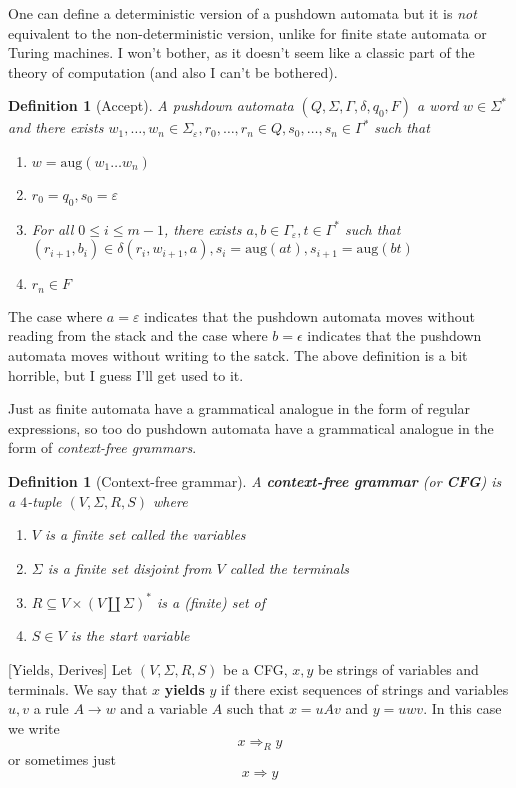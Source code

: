 \documentclass{article}
\theoremstyle{break}
\newtheorem{definition}[theorem]{Definition}
\begin{document}
One can define a deterministic version of a pushdown automata but it is \textit{not} equivalent to the non-deterministic version, unlike for finite state automata or Turing machines.
I won't bother, as it doesn't seem like a classic part of the theory of computation (and also I can't be bothered).

\begin{definition}[Accept]
\label{def:pushdown-accept}
A pushdown automata $(Q,\Sigma, \Gamma, \delta, q_0, F)$ a word $w \in \Sigma^\ast$ and there exists $w_1, \ldots, w_n \in \Sigma_\varepsilon, r_0, \ldots, r_n \in Q, s_0, \ldots, s_n \in \Gamma^*$ such that
\begin{enumerate}
  \item $w = \textrm{aug}(w_1\ldots w_n)$
  \item $r_0 = q_0, s_0 = \varepsilon$
  \item For all $ 0 \leq i \leq m-1$, there exists $a,b\in \Gamma_\varepsilon, t\in \Gamma^*$ such that $(r_{i+1},b_i) \in \delta(r_i, w_{i+1}, a), s_i=\textrm{aug}(at), s_{i+1}=\textrm{aug}(bt)$
  \item $r_n \in F$
\end{enumerate}
\end{definition}

The case where $a = \varepsilon$ indicates that the pushdown automata moves without reading from the stack and the case where $b=\epsilon$ indicates that the pushdown automata moves without writing to the satck. The above definition is a bit horrible, but I guess I'll get used to it.

Just as finite automata have a grammatical analogue in the form of regular expressions, so too do pushdown automata have a grammatical analogue in the form of \textit{context-free grammars}.

\begin{definition}[Context-free grammar]
\label{def:context-free-grammar}
A \textbf{context-free grammar} (or \textbf{CFG}) is a $4$-tuple $(V, \Sigma, R, S)$ where
\begin{enumerate}
  \item $V$ is a finite set called the \textit{variables}
  \item $\Sigma$ is a finite set disjoint from $V$ called the \textit{terminals}
  \item $R \subseteq V\times (V \coprod \Sigma)^\ast$ is a (finite) set of 
  \item $S \in V$ is the \textit{start variable}
\end{enumerate}

\end{definition}[Yields, Derives]
\label{def:yields-derives}
Let $(V, \Sigma, R, S)$ be a CFG, $x, y$ be strings of variables and terminals. 
We say that $x$ \textbf{yields} $y$ if there exist sequences of strings and variables $u,v$ a rule $A \to w$ and a variable $A$ such that $x = uAv$ and $y=uwv$.
In this case we write
\[x \Rightarrow_R y\]
or sometimes just
\[x \Rightarrow y\]
\end{document}
